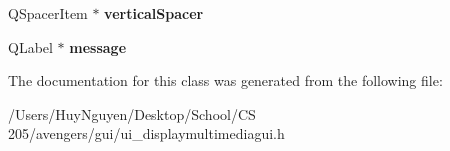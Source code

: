 \begin{DoxyCompactItemize}
\item 
Q\+Spacer\+Item $\ast$ {\bfseries vertical\+Spacer}\hypertarget{classUi__DisplayMultimediaGUI_a250a212265612e5d161b42f5feaef61a}{}\label{classUi__DisplayMultimediaGUI_a250a212265612e5d161b42f5feaef61a}

\item 
Q\+Label $\ast$ {\bfseries message}\hypertarget{classUi__DisplayMultimediaGUI_a6783ca6a9d3ce182f61d819c1eee6564}{}\label{classUi__DisplayMultimediaGUI_a6783ca6a9d3ce182f61d819c1eee6564}

\end{DoxyCompactItemize}


The documentation for this class was generated from the following file\+:\begin{DoxyCompactItemize}
\item 
/\+Users/\+Huy\+Nguyen/\+Desktop/\+School/\+C\+S 205/avengers/gui/ui\+\_\+displaymultimediagui.\+h\end{DoxyCompactItemize}
